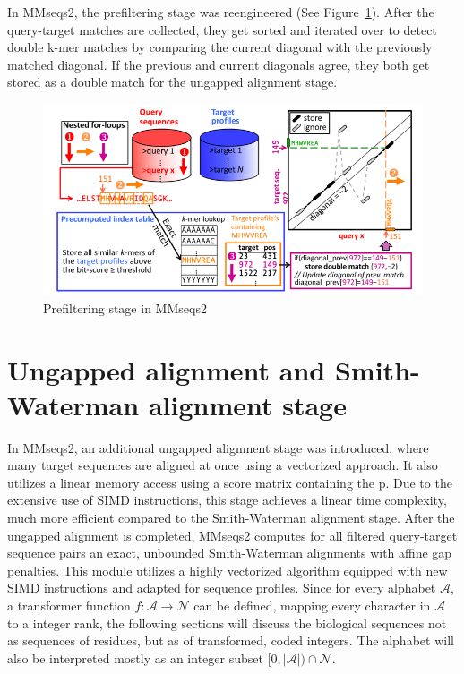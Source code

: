 \documentclass[twoside,a4paper,bsc]{master}
\newcommand{\Alpha}[0]{\mathcal{A}}
\begin{document}
In MMseqs2, the prefiltering stage was reengineered (See
Figure~\ref{fig:prefilterMMseqs2}). After the query-target matches are
collected, they get sorted and iterated over to detect double k-mer matches
by comparing the current diagonal with the previously matched diagonal. If
the previous and current diagonals agree, they both get stored as a double
match for the ungapped alignment stage.
\begin{figure}[t]
\begin{center}
\includegraphics[scale=0.7]{graphics/MMseqs2_prefilter.png}
\end{center}
\caption{Prefiltering stage in MMseqs2}
\label{fig:prefilterMMseqs2}
\end{figure}
\section{Ungapped alignment and Smith-Waterman alignment stage}
In MMseqs2, an additional ungapped alignment stage was introduced, where
many target sequences are aligned at once using a vectorized approach. It
also utilizes a linear memory access using a score matrix containing the p.
Due to the extensive use of SIMD instructions, this stage achieves a linear
time complexity, much more efficient compared to the Smith-Waterman
alignment stage.
After the ungapped alignment is completed, MMseqs2 computes for all
filtered
query-target sequence pairs an exact, unbounded Smith-Waterman alignments
with affine gap penalties. This module utilizes a highly vectorized
algorithm
equipped with new SIMD instructions and adapted for sequence profiles.
Since for every alphabet \(\Alpha\), a transformer function \(f:\Alpha
\rightarrow \mathcal{N}\) can be defined, mapping every character in
\(\Alpha\) to a integer rank, the following sections will discuss the
biological sequences not as sequences of residues, but as of transformed,
coded integers. The alphabet will also be interpreted mostly as an integer
subset \([0,|\mathcal{A}|)\cap \mathcal{N}\).
\end{document}
